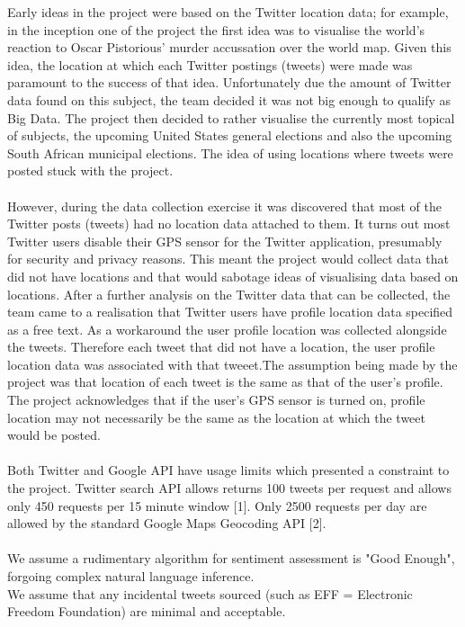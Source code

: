 \documentclass[12pt]{article} %
\begin{document}
	Early ideas in the project were based on the Twitter location data; for example, in the inception one of the project the first idea was to visualise the world's reaction to Oscar Pistorious' murder accussation over the world map. Given this idea, the location at which each Twitter postings (tweets) were made was paramount to the success of that idea. Unfortunately due the amount of Twitter data found on this subject, the team decided it was not big enough to qualify as Big Data. The project then decided to rather visualise the currently most topical of subjects, the upcoming United States general elections and also the upcoming South African municipal elections. The idea of using locations where tweets were posted stuck with the project. 
	\\
	\\
	However, during the data collection exercise it was discovered that most of the Twitter posts (tweets) had no location data attached to them. It turns out most Twitter users disable their GPS sensor for the Twitter application, presumably for security and privacy reasons. This meant the project would collect data that did not have locations and that would sabotage ideas of visualising data based on locations. After a further analysis on the Twitter data that can be collected, the team came to a realisation that Twitter users have profile location data specified as a free text. As a workaround the user profile location was collected alongside the tweets. Therefore each tweet that did not have a location, the user profile location data was associated with that tweeet.The assumption being made by the project was that location of each tweet is the same as that of the user's profile. The project acknowledges that if the user's GPS sensor is turned on, profile location may not necessarily be the same as the location at which the tweet would be posted.
	\\
	\\
	Both Twitter and Google API have usage limits which presented a constraint to the project. Twitter search API allows returns 100 tweets per request and allows only 450 requests per 15 minute window [1]. Only 2500 requests per day are allowed by the standard Google Maps Geocoding API [2].\\
	\\
		We assume a rudimentary algorithm for sentiment assessment is "Good Enough", forgoing complex natural language inference.\\
		We assume that any incidental tweets sourced (such as EFF = Electronic Freedom Foundation) are minimal and acceptable.\\
\end{document}
